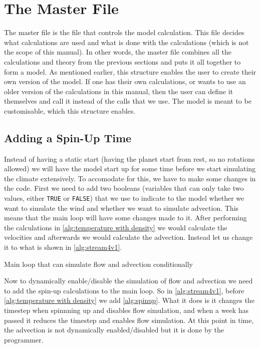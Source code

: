 \section{The Master File}
The master file is the file that controls the model calculation. This file decides what calculations are used and  what is done with the calculations (which is not the scope of this manual).
In other words, the master file combines all the calculations and theory from the previous sections and puts it all together to form a model. As mentioned earlier, this structure enables the 
user to create their own version of the model. If one has their own calculations, or wants to use an older version of the calculations in this manual, then the user can define it themselves
and call it instead of the calls that we use. The model is meant to be customisable, which this structure enables.

\subsection{Adding a Spin-Up Time}
Instead of having a static start (having the planet start from rest, so no rotations allowed) we will have the model start up for some time before we start simulating the climate extensively.
To accomodate for this, we have to make some changes in the code. First we need to add two booleans (variables that can only take two values, either \texttt{TRUE} or \texttt{FALSE}) that we use
to indicate to the model whether we want to simulate the wind and whether we want to simulate advection. This means that the main loop will have some changes made to it. After performing the 
calculations in \autoref{alg:temperature with density} we would calculate the velocities and afterwards we would calculate the advection. Instead let us change it to what is shown in 
\autoref{alg:stream4v1}.

\begin{algorithm}
    \caption{Main loop that can simulate flow and advection conditionally}
    \label{alg:stream4v1}
\end{algorithm}

Now to dynamically enable/disable the simulation of flow and advection we need to add the spin-up calculations to the main loop. So in \autoref{alg:stream4v1}, before 
\autoref{alg:temperature with density} we add \autoref{alg:spinup}. What it does is it changes the timestep when spinnning up and disables flow simulation, and when a week has passed it reduces 
the timestep and enables flow simulation. At this point in time, the advection is not dynamically enabled/disabled but it is done by the programmer.

